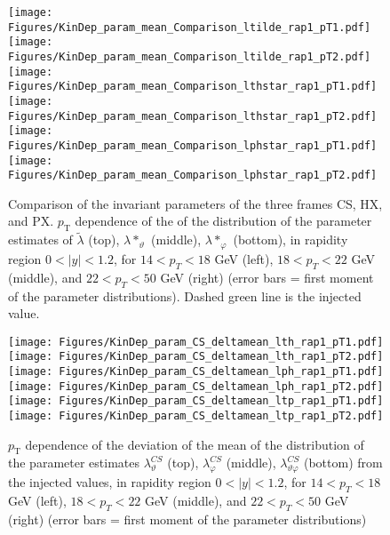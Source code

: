 \documentclass[12pt]{article}
\newcommand{\pT}{p_\mathrm{T}}
\newcommand{\absy}{\left |  y \right |}
\newcommand{\lamtilde}{\tilde{\lambda}}
\newcommand{\lamthstar}{\lambda*_\vartheta}
\newcommand{\lamphstar}{\lambda*_\varphi}
\newcommand{\lamthCS}{\lambda^{\scriptscriptstyle CS}_\vartheta}
\newcommand{\lamphCS}{\lambda^{\scriptscriptstyle CS}_\varphi}
\newcommand{\lamthphCS}{\lambda^{\scriptscriptstyle CS}_{\vartheta \varphi}}
\begin{document}




\begin{figure}[htbp]
\centering
\texttt{[image: Figures/KinDep\_param\_mean\_Comparison\_ltilde\_rap1\_pT1.pdf]}
\texttt{[image: Figures/KinDep\_param\_mean\_Comparison\_ltilde\_rap1\_pT2.pdf]}
\texttt{[image: Figures/KinDep\_param\_mean\_Comparison\_lthstar\_rap1\_pT1.pdf]}
\texttt{[image: Figures/KinDep\_param\_mean\_Comparison\_lthstar\_rap1\_pT2.pdf]}
\texttt{[image: Figures/KinDep\_param\_mean\_Comparison\_lphstar\_rap1\_pT1.pdf]}
\texttt{[image: Figures/KinDep\_param\_mean\_Comparison\_lphstar\_rap1\_pT2.pdf]}
\caption{Comparison of the invariant parameters of the three frames CS, HX,
and PX. $\pT$ dependence of the of the distribution of the
parameter estimates of $\lamtilde$ (top), $\lamthstar$ (middle), $\lamphstar$ (bottom), in rapidity
region $0<\absy<1.2$, for $14 < p_T < 18$ GeV (left), $18 < p_T < 22$ GeV (middle), and $22 < p_T < 50$ GeV (right) (error bars = first moment of the parameter
distributions). Dashed green line is the injected value.}
\end{figure}
\clearpage











\begin{figure}[htbp]
\centering
\texttt{[image: Figures/KinDep\_param\_CS\_deltamean\_lth\_rap1\_pT1.pdf]}
\texttt{[image: Figures/KinDep\_param\_CS\_deltamean\_lth\_rap1\_pT2.pdf]}
\texttt{[image: Figures/KinDep\_param\_CS\_deltamean\_lph\_rap1\_pT1.pdf]}
\texttt{[image: Figures/KinDep\_param\_CS\_deltamean\_lph\_rap1\_pT2.pdf]}
\texttt{[image: Figures/KinDep\_param\_CS\_deltamean\_ltp\_rap1\_pT1.pdf]}
\texttt{[image: Figures/KinDep\_param\_CS\_deltamean\_ltp\_rap1\_pT2.pdf]}
\caption{$\pT$ dependence of the deviation of the mean of the distribution of
the parameter estimates $\lamthCS$ (top), $\lamphCS$ (middle), $\lamthphCS$
(bottom) from the injected values, in rapidity
region $0<\absy<1.2$, for $14 < p_T < 18$ GeV (left), $18 < p_T < 22$ GeV (middle), and $22 < p_T < 50$ GeV (right) (error bars = first moment of the parameter
distributions)}
\end{figure}
\clearpage
\end{document}
